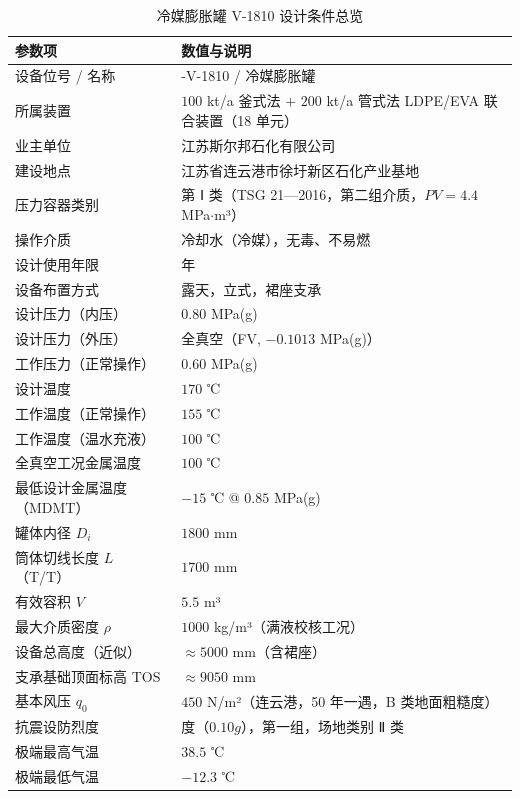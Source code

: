 \begin{table}[htbp]
  \centering
  \caption{冷媒膨胀罐 V-1810 设计条件总览}
  \label{tab:cad-design-overview}
  \small\renewcommand{\arraystretch}{1.15}
  \setlength{\tabcolsep}{6pt}
  \begin{tabularx}{\textwidth}{@{}p{4.8cm} >{\raggedright\arraybackslash}X @{}}
    \toprule
    \textbf{参数项} & \textbf{数值与说明} \\
    \midrule
    设备位号 / 名称        & 22-V-1810 / 冷媒膨胀罐 \\
    所属装置                & $100$ kt/a 釜式法 $+$ $200$ kt/a 管式法 LDPE/EVA 联合装置（18 单元） \\
    业主单位                & 江苏斯尔邦石化有限公司 \\
    建设地点                & 江苏省连云港市徐圩新区石化产业基地 \\
    压力容器类别            & 第 Ⅰ 类（TSG 21—2016，第二组介质，$PV=4.4$ MPa$\cdot$m³） \\
    操作介质                & 冷却水（冷媒），无毒、不易燃 \\
    设计使用年限            & 15 年 \\
    设备布置方式            & 露天，立式，裙座支承 \\
    \midrule
    设计压力（内压）        & $0.80$ MPa(g) \\
    设计压力（外压）        & 全真空（FV, $-0.1013$ MPa(g)） \\
    工作压力（正常操作）    & $0.60$ MPa(g) \\
    设计温度                & $170$ ℃ \\
    工作温度（正常操作）    & $155$ ℃ \\
    工作温度（温水充液）    & $100$ ℃ \\
    全真空工况金属温度      & $100$ ℃ \\
    最低设计金属温度（MDMT）& $-15$ ℃ @ $0.85$ MPa(g) \\
    \midrule
    罐体内径 $D_i$          & $1800$ mm \\
    筒体切线长度 $L$（T/T） & $1700$ mm \\
    有效容积 $V$            & $5.5$ m³ \\
    最大介质密度 $\rho$     & $1000$ kg/m³（满液校核工况） \\
    设备总高度（近似）      & $\approx 5000$ mm（含裙座） \\
    支承基础顶面标高 TOS    & $\approx 9050$ mm \\
    \midrule
    基本风压 $q_0$          & $450$ N/m²（连云港，50 年一遇，B 类地面粗糙度） \\
    抗震设防烈度            & 7 度（$0.10g$），第一组，场地类别 Ⅱ 类 \\
    极端最高气温            & $38.5$ ℃ \\
    极端最低气温            & $-12.3$ ℃ \\
    \bottomrule
  \end{tabularx}
\end{table}

